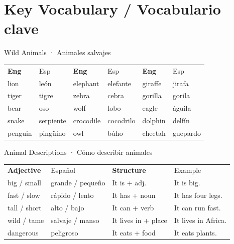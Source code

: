 
\section{Key Vocabulary / Vocabulario clave}

\begin{vocabcard}[colframe=kidsGreen, colbacktitle=kidsGreen]{Wild Animals · Animales salvajes}
\begin{center}
\begin{tabular}{ll@{\qquad}ll@{\qquad}ll}
\bfseries\color{kidsGreen}Eng & \color{kidsGray}Esp &
\bfseries\color{kidsGreen}Eng & \color{kidsGray}Esp &
\bfseries\color{kidsGreen}Eng & \color{kidsGray}Esp \\[4pt]
lion      & león      & elephant & elefante & giraffe   & jirafa    \\
tiger     & tigre     & zebra    & cebra    & gorilla   & gorila    \\
bear      & oso       & wolf     & lobo     & eagle     & águila    \\
snake     & serpiente & crocodile & cocodrilo & dolphin  & delfín    \\
penguin   & pingüino  & owl      & búho     & cheetah   & guepardo  \\
\end{tabular}
\end{center}
\end{vocabcard}

\vspace{10pt}

\begin{vocabcard}[colframe=kidsOrange, colbacktitle=kidsOrange]{Animal Descriptions · Cómo describir animales}
\begin{center}
\begin{tabular}{ll@{\qquad}ll}
\bfseries\color{kidsOrange}Adjective & \color{kidsGray}Español &
\bfseries\color{kidsOrange}Structure & \color{kidsGray}Example \\[4pt]
big / small    & grande / pequeño  & It is + adj.         & It is big.           \\
fast / slow    & rápido / lento    & It has + noun        & It has four legs.    \\
tall / short   & alto / bajo       & It can + verb        & It can run fast.     \\
wild / tame    & salvaje / manso   & It lives in + place  & It lives in Africa.  \\
dangerous      & peligroso         & It eats + food       & It eats plants.      \\
\end{tabular}
\end{center}
\end{vocabcard}

